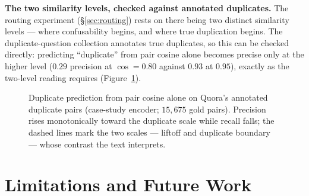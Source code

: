 \documentclass[11pt,letterpaper]{article}
\begin{document}
\textbf{The two similarity levels, checked against annotated
duplicates.} The routing experiment (\S\ref{sec:routing}) rests on
there being two distinct similarity levels --- where confusability
begins, and where true duplication begins. The duplicate-question
collection annotates true duplicates, so this can be checked directly:
predicting ``duplicate'' from pair cosine alone becomes precise only at
the higher level ($0.29$ precision at $\cos = 0.80$ against $0.93$ at
$0.95$), exactly as the two-level reading requires
(Figure~\ref{fig:dedupf1}).

\begin{figure}[t]
\centering
{}
\caption{Duplicate prediction from pair cosine alone on Quora's annotated
duplicate pairs (case-study encoder; $15{,}675$ gold pairs). Precision
rises monotonically toward the duplicate scale while recall falls; the
dashed lines mark the two scales --- liftoff and duplicate boundary ---
whose contrast the text interprets.}
\label{fig:dedupf1}
\end{figure}

\section{Limitations and Future Work}
\end{document}
